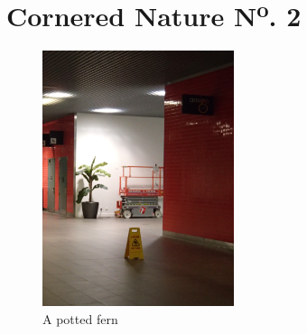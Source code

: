 \documentclass{book}
\begin{document}
    \chapter{Cornered Nature N\textsuperscript{o}. 2}
        \begin{figure}
            \centering
            \includegraphics[width=0.5\textwidth]{figures/P1050158.JPG}
            \caption{\label{fig:pottedfern}A potted fern}
        \end{figure}
    \printindex
\end{document}
